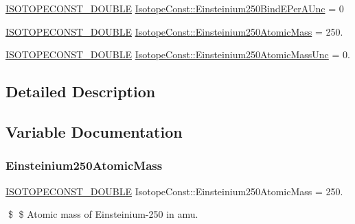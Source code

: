 \begin{DoxyCompactItemize}
\mbox{\hyperlink{group___isotope_const-_macros_ga8f45a7272ce02c0b4c65c44636ed719a}{I\+S\+O\+T\+O\+P\+E\+C\+O\+N\+S\+T\+\_\+\+D\+O\+U\+B\+LE}} \mbox{\hyperlink{group___isotope_const-_einsteinium-_es250_ga06ad42b67d16ca1c4c7d0660bebafd76}{Isotope\+Const\+::\+Einsteinium250\+Bind\+E\+Per\+A\+Unc}} = 0
\item 
\mbox{\hyperlink{group___isotope_const-_macros_ga8f45a7272ce02c0b4c65c44636ed719a}{I\+S\+O\+T\+O\+P\+E\+C\+O\+N\+S\+T\+\_\+\+D\+O\+U\+B\+LE}} \mbox{\hyperlink{group___isotope_const-_einsteinium-_es250_gabbb8d186bbe4b5af6135c20c9da34269}{Isotope\+Const\+::\+Einsteinium250\+Atomic\+Mass}} = 250.
\item 
\mbox{\hyperlink{group___isotope_const-_macros_ga8f45a7272ce02c0b4c65c44636ed719a}{I\+S\+O\+T\+O\+P\+E\+C\+O\+N\+S\+T\+\_\+\+D\+O\+U\+B\+LE}} \mbox{\hyperlink{group___isotope_const-_einsteinium-_es250_gad4ba96718481e95ea43811ad3110730a}{Isotope\+Const\+::\+Einsteinium250\+Atomic\+Mass\+Unc}} = 0.
\end{DoxyCompactItemize}


\subsection{Detailed Description}


\subsection{Variable Documentation}
\mbox{\label{group___isotope_const-_einsteinium-_es250_gabbb8d186bbe4b5af6135c20c9da34269}} 
\subsubsection{\texorpdfstring{Einsteinium250\+Atomic\+Mass}{Einsteinium250AtomicMass}}
{\footnotesize\ttfamily \mbox{\hyperlink{group___isotope_const-_macros_ga8f45a7272ce02c0b4c65c44636ed719a}{I\+S\+O\+T\+O\+P\+E\+C\+O\+N\+S\+T\+\_\+\+D\+O\+U\+B\+LE}} Isotope\+Const\+::\+Einsteinium250\+Atomic\+Mass = 250.}

\$ \$ Atomic mass of Einsteinium-\/250 in amu. \mbox{\label{group___isotope_const-_einsteinium-_es250_gad4ba96718481e95ea43811ad3110730a}} 
